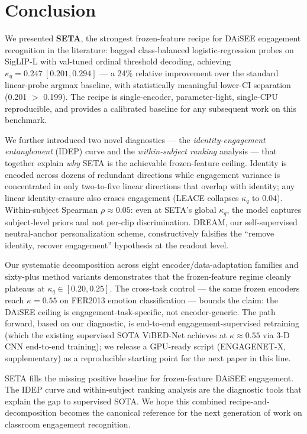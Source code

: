 \section{Conclusion}
\label{sec:conclusion}

We presented \textbf{SETA}, the strongest frozen-feature recipe for
DAiSEE engagement recognition in the literature: bagged class-balanced
logistic-regression probes on SigLIP-L with val-tuned ordinal
threshold decoding, achieving $\kappa_q = 0.247~[0.201, 0.294]$ ---
a 24\% relative improvement over the standard linear-probe argmax
baseline, with statistically meaningful lower-CI separation
(0.201 $>$ 0.199). The recipe is single-encoder, parameter-light,
single-CPU reproducible, and provides a calibrated baseline for any
subsequent work on this benchmark.

We further introduced two novel diagnostics --- the
\emph{identity-engagement entanglement} (IDEP) curve and the
\emph{within-subject ranking} analysis --- that together explain
\emph{why} SETA is the achievable frozen-feature ceiling. Identity
is encoded across dozens of redundant directions while engagement
variance is concentrated in only two-to-five linear directions that
overlap with identity; any linear identity-erasure also erases
engagement (LEACE collapses $\kappa_q$ to $0.04$). Within-subject
Spearman $\rho \approx 0.05$: even at SETA's global $\kappa_q$, the
model captures subject-level priors and not per-clip discrimination.
DREAM, our self-supervised neutral-anchor personalization scheme,
constructively falsifies the ``remove identity, recover
engagement'' hypothesis at the readout level.

Our systematic decomposition across eight encoder/data-adaptation
families and sixty-plus method variants demonstrates that the
frozen-feature regime cleanly plateaus at $\kappa_q \in [0.20, 0.25]$.
The cross-task control --- the same frozen encoders reach
$\kappa = 0.55$ on FER2013 emotion classification --- bounds the
claim: the DAiSEE ceiling is engagement-task-specific, not
encoder-generic. The path forward, based on our diagnostic, is
end-to-end engagement-supervised retraining (which the existing
supervised SOTA ViBED-Net achieves at $\kappa \approx 0.55$ via 3-D
CNN end-to-end training); we release a GPU-ready script
(ENGAGENET-X, supplementary) as a reproducible starting point for
the next paper in this line.

SETA fills the missing positive baseline for frozen-feature DAiSEE
engagement. The IDEP curve and within-subject ranking analysis are
the diagnostic tools that explain the gap to supervised SOTA. We
hope this combined recipe-and-decomposition becomes the canonical
reference for the next generation of work on classroom engagement
recognition.
